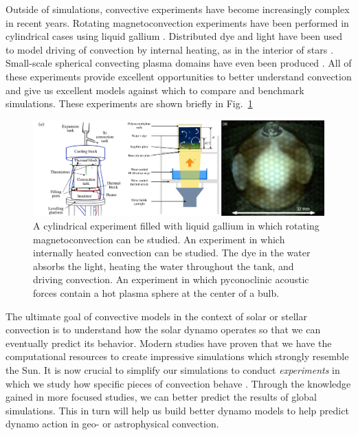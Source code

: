Outside of simulations, convective experiments have become increasingly complex in recent years.
Rotating magnetoconvection experiments have been performed in cylindrical cases using liquid gallium \citep{aurnou&all2018}.
Distributed dye and light have been used to model driving of convection by internal heating, as in the interior of stars \citep{bouillaut&all2019}.
Small-scale spherical convecting plasma domains have even been produced \citep{koulakis&all2018}.
All of these experiments provide excellent opportunities to better understand convection and give us excellent models against which to compare and benchmark simulations.
These experiments are shown briefly in Fig.~\ref{fig:convective_experiments}

\begin{figure}[t!]
\vspace{0.25cm}
\includegraphics[width=\textwidth]{./figs/intro/convective_experiments.pdf}
\caption[Modern convective experiments.]
{
	\citep[left, Fig.~1a of][]{aurnou&all2018} A cylindrical experiment filled with liquid gallium in which rotating magnetoconvection can be studied.
	\citep[middle, Fig.~1a of][]{bouillaut&all2019} An experiment in which internally heated convection can be studied.
	The dye in the water absorbs the light, heating the water throughout the tank, and driving convection.
	\citep[right, Fig.~3a of][]{koulakis&all2018} An experiment in which pyconoclinic acoustic forces contain a hot plasma sphere at the center of a bulb.
	\label{fig:convective_experiments} 
}
\end{figure}


The ultimate goal of convective models in the context of solar or stellar convection is to understand how the solar dynamo operates so that we can eventually predict its behavior.
Modern studies have proven that we have the computational resources to create impressive simulations which strongly resemble the Sun.
It is now crucial to simplify our simulations to conduct \emph{experiments} in which we study how specific pieces of convection behave \citep[such as in the studies of tachocline interactions of][]{wood&brummell2018}.
Through the knowledge gained in more focused studies, we can better predict the results of global simulations.
This in turn will help us build better dynamo models to help predict dynamo action in geo- or astrophysical convection.


